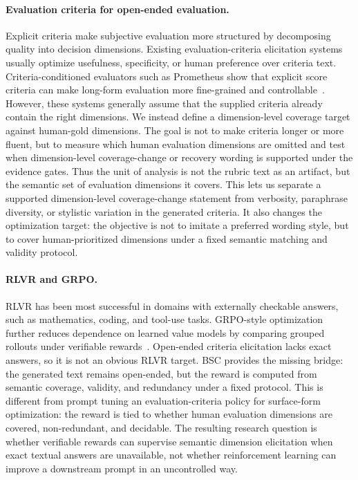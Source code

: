 \paragraph{Evaluation criteria for open-ended evaluation.}
Explicit criteria make subjective evaluation more structured by decomposing
quality into decision dimensions. Existing evaluation-criteria elicitation
systems usually optimize usefulness, specificity, or human preference over
criteria text. Criteria-conditioned evaluators such as Prometheus show that explicit score criteria can make
long-form evaluation more fine-grained and controllable~\cite{kim2023prometheus}.
However, these systems generally assume that the supplied criteria already
contain the right dimensions. We instead define a dimension-level coverage
target against human-gold dimensions. The goal is not to make criteria longer or
more fluent, but to measure which human evaluation dimensions are omitted and
test when dimension-level coverage-change or recovery wording is supported
under the evidence gates.
Thus the unit of analysis is not the rubric text as an artifact, but the
semantic set of evaluation dimensions it covers. This lets us separate a
supported dimension-level coverage-change statement from verbosity, paraphrase
diversity, or stylistic variation in the generated criteria.
It also changes the optimization target: the objective is not to imitate a
preferred wording style, but to cover human-prioritized dimensions under a
fixed semantic matching and validity protocol.

\paragraph{RLVR and GRPO.}
RLVR has been most successful in domains with externally checkable answers,
such as mathematics, coding, and tool-use tasks. GRPO-style optimization
further reduces dependence on learned value models by comparing grouped
rollouts under verifiable rewards~\cite{shao2024deepseekmath,guo2025deepseekr1}.
Open-ended criteria elicitation lacks exact answers, so it is not an obvious RLVR target.
BSC provides the missing bridge: the generated text remains open-ended, but the
reward is computed from semantic coverage, validity, and redundancy under a
fixed protocol. This is different from prompt tuning an evaluation-criteria
policy for surface-form optimization: the reward is tied to whether human evaluation
dimensions are covered, non-redundant, and decidable.
The resulting research question is whether verifiable rewards can supervise
semantic dimension elicitation when exact textual answers are unavailable, not
whether reinforcement learning can improve a downstream prompt in an
uncontrolled way.

